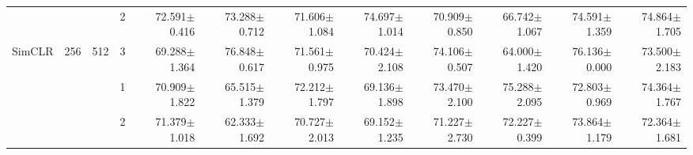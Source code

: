 \begin{table}[htpb]
{\begin{tabular}{c|c|c|c|rr|rr|rr|rr}
                                 &                                                                                 &                                                                                        & 2                                                                                         & 72.591$\pm$0.416                        & 73.288$\pm$0.712                        & 71.606$\pm$1.084                        & 74.697$\pm$1.014                        & 70.909$\pm$0.850                        & 66.742$\pm$1.067                        & 74.591$\pm$1.359                        & 74.864$\pm$1.705                       \\
\multirow{-12}{*}{SimCLR}        & \multirow{-6}{*}{256}                                                           & \multirow{-3}{*}{512}                                                                  & 3                                                                                         & 69.288$\pm$1.364                        & 76.848$\pm$0.617                        & 71.561$\pm$0.975                        & 70.424$\pm$2.108                        & 74.106$\pm$0.507                        & 64.000$\pm$1.420                        & 76.136$\pm$0.000                        & 73.500$\pm$2.183                       \\ \hline
                                 &                                                                                 &                                                                                        & 1                                                                                         & 70.909$\pm$1.822                        & 65.515$\pm$1.379                        & 72.212$\pm$1.797                        & 69.136$\pm$1.898                        & 73.470$\pm$2.100                        & 75.288$\pm$2.095                        & 72.803$\pm$0.969                        & 74.364$\pm$1.767                       \\
                                 &                                                                                 &                                                                                        & 2                                                                                         & 71.379$\pm$1.018                        & 62.333$\pm$1.692                        & 70.727$\pm$2.013                        & 69.152$\pm$1.235                        & 71.227$\pm$2.730                        & 72.227$\pm$0.399                        & 73.864$\pm$1.179                        & 72.364$\pm$1.681                       \\

\end{tabular}}
\end{table}
